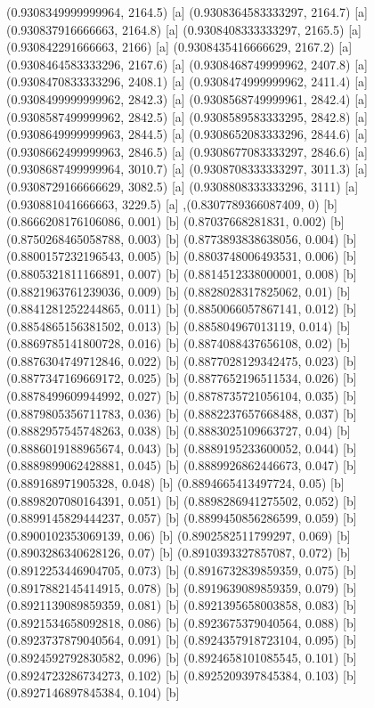 {{{(0.9308349999999964, 2164.5) [a] 
(0.9308364583333297, 2164.7) [a] 
(0.930837916666663, 2164.8) [a] 
(0.9308408333333297, 2165.5) [a] 
(0.930842291666663, 2166) [a] 
(0.9308435416666629, 2167.2) [a] 
(0.9308464583333296, 2167.6) [a] 
(0.9308468749999962, 2407.8) [a] 
(0.9308470833333296, 2408.1) [a] 
(0.9308474999999962, 2411.4) [a] 
(0.9308499999999962, 2842.3) [a] 
(0.9308568749999961, 2842.4) [a] 
(0.9308587499999962, 2842.5) [a] 
(0.9308589583333295, 2842.8) [a] 
(0.9308649999999963, 2844.5) [a] 
(0.9308652083333296, 2844.6) [a] 
(0.9308662499999963, 2846.5) [a] 
(0.9308677083333297, 2846.6) [a] 
(0.9308687499999964, 3010.7) [a] 
(0.9308708333333297, 3011.3) [a] 
(0.9308729166666629, 3082.5) [a] 
(0.9308808333333296, 3111) [a] 
(0.930881041666663, 3229.5) [a] 
},{(0.8307789366087409, 0) [b] 
(0.8666208176106086, 0.001) [b] 
(0.87037668281831, 0.002) [b] 
(0.8750268465058788, 0.003) [b] 
(0.8773893838638056, 0.004) [b] 
(0.8800157232196543, 0.005) [b] 
(0.8803748006493531, 0.006) [b] 
(0.8805321811166891, 0.007) [b] 
(0.8814512338000001, 0.008) [b] 
(0.8821963761239036, 0.009) [b] 
(0.8828028317825062, 0.01) [b] 
(0.8841281252244865, 0.011) [b] 
(0.8850066057867141, 0.012) [b] 
(0.8854865156381502, 0.013) [b] 
(0.885804967013119, 0.014) [b] 
(0.8869785141800728, 0.016) [b] 
(0.8874088437656108, 0.02) [b] 
(0.8876304749712846, 0.022) [b] 
(0.8877028129342475, 0.023) [b] 
(0.8877347169669172, 0.025) [b] 
(0.8877652196511534, 0.026) [b] 
(0.8878499609944992, 0.027) [b] 
(0.8878735721056104, 0.035) [b] 
(0.8879805356711783, 0.036) [b] 
(0.8882237657668488, 0.037) [b] 
(0.8882957545748263, 0.038) [b] 
(0.8883025109663727, 0.04) [b] 
(0.8886019188965674, 0.043) [b] 
(0.8889195233600052, 0.044) [b] 
(0.8889899062428881, 0.045) [b] 
(0.8889926862446673, 0.047) [b] 
(0.889168971905328, 0.048) [b] 
(0.8894665413497724, 0.05) [b] 
(0.8898207080164391, 0.051) [b] 
(0.8898286941275502, 0.052) [b] 
(0.8899145829444237, 0.057) [b] 
(0.8899450856286599, 0.059) [b] 
(0.8900102353069139, 0.06) [b] 
(0.8902582511799297, 0.069) [b] 
(0.8903286340628126, 0.07) [b] 
(0.8910393327857087, 0.072) [b] 
(0.8912253446904705, 0.073) [b] 
(0.8916732839859359, 0.075) [b] 
(0.8917882145414915, 0.078) [b] 
(0.8919639089859359, 0.079) [b] 
(0.8921139089859359, 0.081) [b] 
(0.8921395658003858, 0.083) [b] 
(0.8921534658092818, 0.086) [b] 
(0.8923675379040564, 0.088) [b] 
(0.8923737879040564, 0.091) [b] 
(0.8924357918723104, 0.095) [b] 
(0.8924592792830582, 0.096) [b] 
(0.8924658101085545, 0.101) [b] 
(0.8924723286734273, 0.102) [b] 
(0.8925209397845384, 0.103) [b] 
(0.8927146897845384, 0.104) [b] 
}}}
